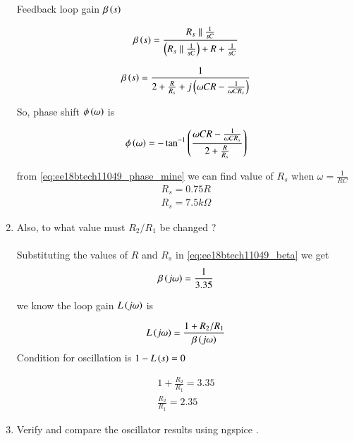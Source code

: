\begin{enumerate}[label=\arabic*.,ref=\theenumi]
Feedback loop gain $\beta\left(s\right)$

\begin{align}
\label{eq:ee18btech11049_beta}
    \beta\brak{s} = \frac{R_s \parallel \frac{1}{sC}}{\brak{R_s \parallel \frac{1}{sC}} + R + \frac{1}{sC}}
\end{align}

\begin{align}
\label{eq:ee18btech11049_freq}
    \beta\brak{s} = \frac{1}{2 + \frac{R}{R_s} + j\brak{\omega CR - \frac{1}{\omega CR_s}}}
\end{align}

So, phase shift $\phi\left(\omega\right)$ is

\begin{align}
\label{eq:ee18btech11049_phase_mine}
    \phi\brak{\omega}  = -\tan^{-1}\brak{\frac{\omega CR - \frac{1}{\omega CR_s}}{2+\frac{R}{R_s}}}
\end{align}

from \ref{eq:ee18btech11049_phase_mine} we can find value of $R_s$ when $\omega = \frac{1}{RC}$ 
\begin{align}
   R_s = 0.75R \\
   R_s = 7.5k\Omega 
\end{align}


\item Also, to what value must $R_2/R_1$ be changed ?
\\
\\
\solution Substituting the values of $R $ and $ R_s$ in \ref{eq:ee18btech11049_beta} we get
\begin{align}
    \beta\left(j\omega\right) = \frac{1}{3.35}
\end{align}
%

we know the loop gain $L\left(j\omega\right)$ is


\begin{align}
    L\left(j\omega\right) = \frac{1+R_2/R_1}{\beta \left(j\omega\right)}
\end{align}
Condition for oscillation is $1-L\left(s\right) = 0$

\begin{align}
    1 + \frac{R_2}{R_1} = 3.35 \\
    \frac{R_2}{R_1} = 2.35
\end{align}

\item Verify and compare the oscillator results using ngspice . 
\\

\solution 


\end{enumerate}
